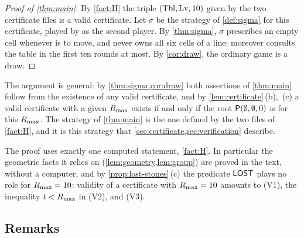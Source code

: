\begin{proof}[Proof of \cref{thm:main}]
By \cref{fact:H} the triple $(\mathrm{Tbl},\mathrm{Lv},10)$ given by the two certificate files is a valid certificate. Let
$\sigma$ be the strategy of \cref{def:sigma} for this certificate, played by \Breaker{} as the second
player. By \cref{thm:sigma}, $\sigma$ prescribes an empty cell whenever \Breaker{} is to move, and \Maker{}
never owns all six cells of a line; moreover \Breaker{} consults the table in the first ten rounds at most.
By \cref{cor:draw}, the ordinary game is a draw.
\end{proof}

The argument is general: by \cref{thm:sigma,cor:draw} both assertions of \cref{thm:main} follow from the
existence of any valid certificate, and by \cref{lem:certificate}\,(b),~(c) a valid certificate with a given
$R_{\max}$ exists if and only if the root $\mathsf{P}(\emptyset,\emptyset,0)$ is \WON{} for this $R_{\max}$. The
strategy of \cref{thm:main} is the one defined by the two files of \cref{fact:H}, and it is this strategy
that \cref{sec:certificate,sec:verification} describe.

The proof uses exactly one computed statement, \cref{fact:H}. In particular the geometric facts
it relies on (\cref{lem:geometry,lem:group}) are proved in the text, without a computer, and by
\cref{prop:lost-stones}\,(c) the predicate $\mathsf{LOST}$ plays no role for $R_{\max}=10$: validity of a
certificate with $R_{\max}=10$ amounts to (V1), the inequality $t<R_{\max}$ in (V2), and (V3).

\subsection{Remarks}\label{sec:game-remarks}


